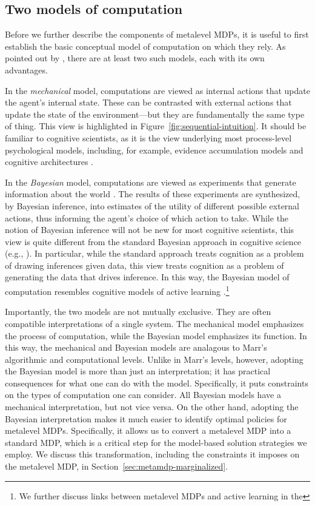 \subsection{Two models of computation}

Before we further describe the components of metalevel MDPs, it is useful to first establish the basic conceptual model of computation on which they rely. As pointed out by \citet[Chapter~7]{hay2016principles}, there are at least two such models, each with its own advantages.

In the \emph{mechanical} model, computations are viewed as internal actions that update the agent's internal state. These can be contrasted with external actions that update the state of the environment---but they are fundamentally the same type of thing. This view is highlighted in Figure~\ref{fig:sequential-intuition}. It should be familiar to cognitive scientists, as it is the view underlying most process-level psychological models, including, for example, evidence accumulation models and cognitive architectures .

In the \emph{Bayesian} model, computations are viewed as experiments that generate information about the world \citep{matheson1968economic}. The results of these experiments are synthesized, by Bayesian inference, into estimates of the utility of different possible external actions, thus informing the agent's choice of which action to take. While the notion of Bayesian inference will not be new for most cognitive scientists, this view is quite different from the standard Bayesian approach in cognitive science (e.g., \citealp{tenenbaum2011how}). In particular, while the standard approach treats cognition as a problem of drawing inferences given data, this view treats cognition as a problem of generating the data that drives inference. In this way, the Bayesian model of computation resembles cognitive models of active learning \citep{gureckis2012selfdirected,gottlieb2013informationseeking}.\footnote{We further discuss links between metalevel MDPs and active learning in the }

Importantly, the two models are not mutually exclusive. They are often compatible interpretations of a single system. The mechanical model emphasizes the process of computation, while the Bayesian model emphasizes its function. In this way, the mechanical and Bayesian models are analagous to Marr's algorithmic and computational levels. Unlike in Marr's levels, however, adopting the Bayesian model is more than just an interpretation; it has practical consequences for what one can do with the model. Specifically, it puts constraints on the types of computation one can consider. All Bayesian models have a mechanical interpretation, but not vice versa. On the other hand, adopting the Bayesian interpretation makes it much easier to identify optimal policies for metalevel MDPs. Specifically, it allows us to convert a metalevel MDP into a standard MDP, which is a critical step for the model-based solution strategies we employ. We discuss this transformation, including the constraints it imposes on the metalevel MDP, in Section~\ref{sec:metamdp-marginalized}.

